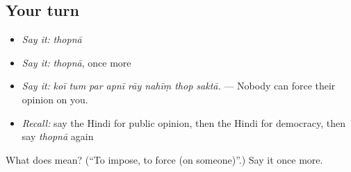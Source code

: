 \subsection*{Your turn}
\begin{itemize}
\raggedright
  \item \emph{Say it:} \emph{thopnā}
  \item \emph{Say it:} \emph{thopnā}, once more
  \item \emph{Say it:} \emph{koī tum par apnī rāy nahīṃ thop saktā.} — Nobody can force their opinion on you.
  \item \emph{Recall:} say the Hindi for public opinion, then the Hindi for democracy, then say \emph{thopnā} again
\end{itemize}

\begin{tcolorbox}[breakable,colback=teal!4,colframe=teal!35!black,title={Before you move on}]
What does  mean? (\textquotedblleft{}To impose, to force (on someone)\textquotedblright{}.) Say it once more.
\end{tcolorbox}

